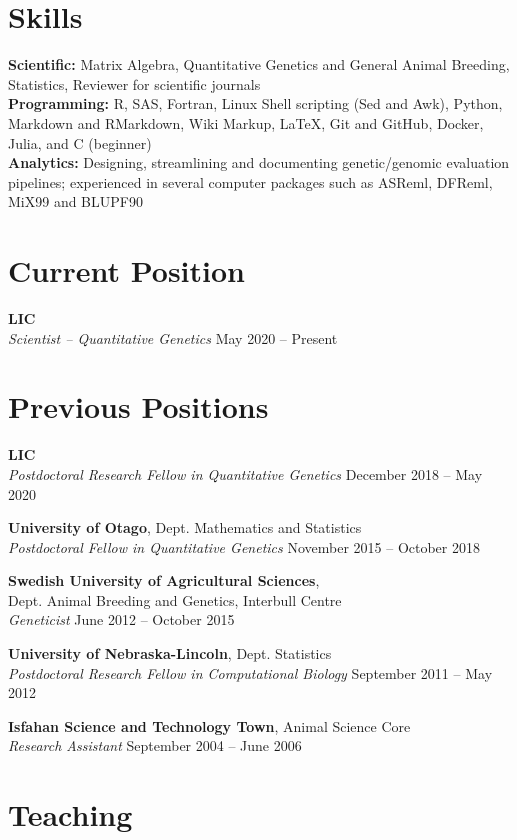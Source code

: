 \documentclass[margin,line]{res}
\begin{document}
\begin{resume}
\section{\sc Skills}

{\bf Scientific:} Matrix Algebra, Quantitative Genetics and General Animal Breeding, Statistics, Reviewer for scientific journals \\
{\bf Programming:} R, SAS, Fortran, Linux Shell scripting (Sed and Awk), Python, Markdown and RMarkdown, Wiki Markup, \LaTeX{}, Git and GitHub, Docker, Julia, and C (beginner) \\
{\bf Analytics:} Designing, streamlining and documenting genetic/genomic evaluation pipelines; experienced in several computer packages such as ASReml, DFReml, MiX99 and BLUPF90
\section{\sc Current Position}

{\bf LIC} \\
{\em Scientist -- Quantitative Genetics} \hfill{May 2020 -- Present}
\section{\sc Previous Positions}

{\bf LIC} \\
{\em Postdoctoral Research Fellow in Quantitative Genetics} \hfill{December 2018 -- May 2020}

{\bf University of Otago}, Dept. Mathematics and Statistics \\
{\em Postdoctoral Fellow in Quantitative Genetics} \hfill{November 2015 -- October 2018}

{\bf Swedish University of Agricultural Sciences}, \\
Dept. Animal Breeding and Genetics, Interbull Centre \\
{\em Geneticist} \hfill{June 2012 -- October 2015}

{\bf University of Nebraska-Lincoln}, Dept. Statistics \\
{\em Postdoctoral Research Fellow in Computational Biology} \hfill{September 2011 -- May 2012}

{\bf Isfahan Science and Technology Town}, Animal Science Core \\
{\em Research Assistant} \hfill{September 2004 -- June 2006}
\section{\sc Teaching}


\end{resume}
\end{document}
